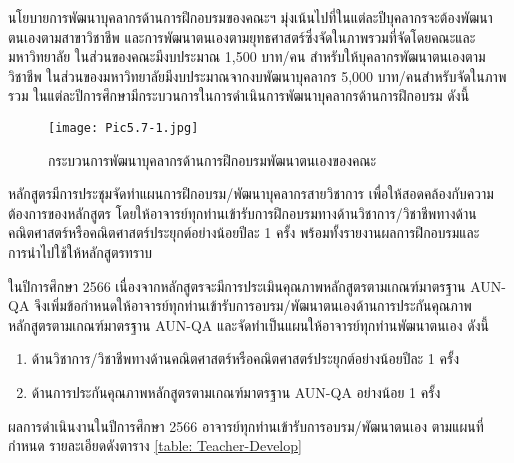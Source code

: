 นโยบายการพัฒนาบุคลากรด้านการฝึกอบรมของคณะฯ มุ่งเน้นไปที่ในแต่ละปีบุคลากรจะต้องพัฒนาตนเองตามสาขาวิชาชีพ และการพัฒนาตนเองตามยุทธศาสตร์ซึ่งจัดในภาพรวมที่จัดโดยคณะและมหาวิทยาลัย ในส่วนของคณะมีงบประมาณ 1,500 บาท/คน สำหรับให้บุคลากรพัฒนาตนเองตามวิชาชีพ ในส่วนของมหาวิทยาลัยมีงบประมาณจากงบพัฒนาบุคลากร 5,000 บาท/คนสำหรับจัดในภาพรวม ในแต่ละปีการศึกษามีกระบวนการในการดำเนินการพัฒนาบุคลากรด้านการฝึกอบรม  ดังนี้

\begin{figure}[h!]
	\texttt{[image: Pic5.7-1.jpg]}
	\caption{กระบวนการพัฒนาบุคลากรด้านการฝึกอบรมพัฒนาตนเองของคณะ}
	\label{Pic5.7-1}
\end{figure}
หลักสูตรมีการประชุมจัดทำแผนการฝึกอบรม/พัฒนาบุคลากรสายวิชาการ เพื่อให้สอดคล้องกับความต้องการของหลักสูตร โดยให้อาจารย์ทุกท่านเข้ารับการฝึกอบรมทางด้านวิชาการ/วิชาชีพทางด้านคณิตศาสตร์หรือคณิตศาสตร์ประยุกต์อย่างน้อยปีละ 1 ครั้ง พร้อมทั้งรายงานผลการฝึกอบรมและการนำไปใช้ให้หลักสูตรทราบ

ในปีการศึกษา 2566 เนื่องจากหลักสูตรจะมีการประเมินคุณภาพหลักสูตรตามเกณฑ์มาตรฐาน AUN-QA จึงเพิ่มข้อกำหนดให้อาจารย์ทุกท่านเข้ารับการอบรม/พัฒนาตนเองด้านการประกันคุณภาพหลักสูตรตามเกณฑ์มาตรฐาน AUN-QA และจัดทำเป็นแผนให้อาจารย์ทุกท่านพัฒนาตนเอง ดังนี้
\begin{enumerate}
	\item ด้านวิชาการ/วิชาชีพทางด้านคณิตศาสตร์หรือคณิตศาสตร์ประยุกต์อย่างน้อยปีละ 1 ครั้ง
	\item ด้านการประกันคุณภาพหลักสูตรตามเกณฑ์มาตรฐาน AUN-QA อย่างน้อย 1 ครั้ง
\end{enumerate}

ผลการดำเนินงานในปีการศึกษา 2566 อาจารย์ทุกท่านเข้ารับการอบรม/พัฒนาตนเอง ตามแผนที่กำหนด รายละเอียดดังตาราง \ref{table: Teacher-Develop}


